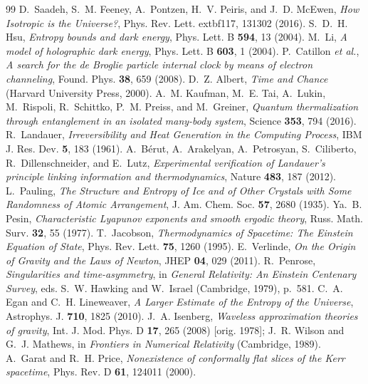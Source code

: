 \documentclass[11pt]{article}
\begin{document}
\begin{thebibliography}{99}
 D.~Saadeh, S.~M. Feeney, A.~Pontzen, H.~V. Peiris, and J.~D. McEwen, \emph{How Isotropic is the Universe?}, Phys. Rev. Lett. 	extbf{117}, 131302 (2016).
 S.~D.~H. Hsu, \emph{Entropy bounds and dark energy}, Phys. Lett. B \textbf{594}, 13 (2004).
 M.~Li, \emph{A model of holographic dark energy}, Phys. Lett. B \textbf{603}, 1 (2004).
 P.~Catillon \emph{et al.}, \emph{A search for the de Broglie particle internal clock by means of electron channeling}, Found. Phys. \textbf{38}, 659 (2008).
 D.~Z. Albert, \emph{Time and Chance} (Harvard University Press, 2000).
 A.~M. Kaufman, M.~E. Tai, A.~Lukin, M.~Rispoli, R.~Schittko, P.~M. Preiss, and M.~Greiner, \emph{Quantum thermalization through entanglement in an isolated many-body system}, Science \textbf{353}, 794 (2016).
 R.~Landauer, \emph{Irreversibility and Heat Generation in the Computing Process}, IBM J. Res. Dev. \textbf{5}, 183 (1961).
 A.~B\'erut, A.~Arakelyan, A.~Petrosyan, S.~Ciliberto, R.~Dillenschneider, and E.~Lutz, \emph{Experimental verification of Landauer's principle linking information and thermodynamics}, Nature \textbf{483}, 187 (2012).
 L.~Pauling, \emph{The Structure and Entropy of Ice and of Other Crystals with Some Randomness of Atomic Arrangement}, J. Am. Chem. Soc. \textbf{57}, 2680 (1935).
 Ya.~B. Pesin, \emph{Characteristic Lyapunov exponents and smooth ergodic theory}, Russ. Math. Surv. \textbf{32}, 55 (1977).
 T.~Jacobson, \emph{Thermodynamics of Spacetime: The Einstein Equation of State}, Phys. Rev. Lett. \textbf{75}, 1260 (1995).
 E.~Verlinde, \emph{On the Origin of Gravity and the Laws of Newton}, JHEP \textbf{04}, 029 (2011).
 R.~Penrose, \emph{Singularities and time-asymmetry}, in \emph{General Relativity: An Einstein Centenary Survey}, eds. S.~W. Hawking and W.~Israel (Cambridge, 1979), p.~581.
 C.~A. Egan and C.~H. Lineweaver, \emph{A Larger Estimate of the Entropy of the Universe}, Astrophys. J. \textbf{710}, 1825 (2010).
 J.~A. Isenberg, \emph{Waveless approximation theories of gravity}, Int. J. Mod. Phys. D \textbf{17}, 265 (2008) [orig. 1978]; J.~R. Wilson and G.~J. Mathews, in \emph{Frontiers in Numerical Relativity} (Cambridge, 1989).
 A.~Garat and R.~H. Price, \emph{Nonexistence of conformally flat slices of the Kerr spacetime}, Phys. Rev. D \textbf{61}, 124011 (2000).

\end{thebibliography}
\end{document}
